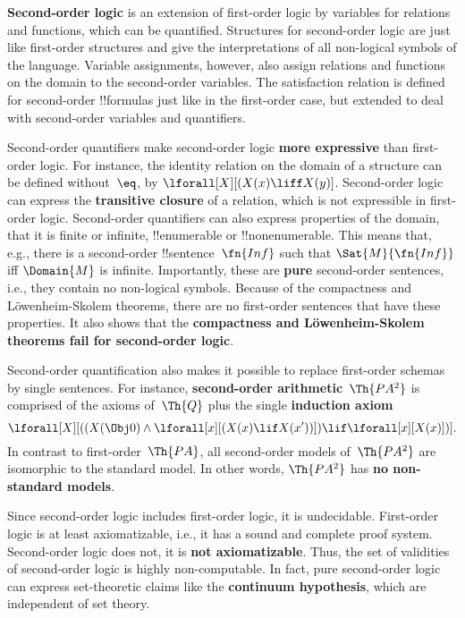 \textbf{Second-order logic} is an extension of first-order logic by
variables for relations and functions, which can be
quantified. Structures for second-order logic are just like
first-order structures and give the interpretations of all non-logical
symbols of the language.  Variable assignments, however, also assign
relations and functions on the domain to the second-order
variables. The satisfaction relation is defined for second-order
!!{formula}s just like in the first-order case, but extended to deal
with second-order variables and quantifiers.

Second-order quantifiers make second-order logic \textbf{more
  expressive} than first-order logic.  For instance, the identity
relation on the domain of a structure can be defined without~$\eq$, by
$\lforall[X][(X(x) \liff X(y)]$. Second-order logic can express the
\textbf{transitive closure} of a relation, which is not expressible in
first-order logic.  Second-order quantifiers can also express
properties of the domain, that it is finite or infinite,
!!{enumerable} or !!{nonenumerable}. This means that, e.g., there is a
second-order !!{sentence}~$\fn{Inf}$ such that $\Sat{M}{\fn{Inf}}$ iff
$\Domain{M}$ is infinite. Importantly, these are \textbf{pure}
second-order sentences, i.e., they contain no non-logical
symbols. Because of the compactness and L\"owenheim-Skolem theorems,
there are no first-order sentences that have these properties.  It
also shows that the \textbf{compactness and L\"owenheim-Skolem
  theorems fail for second-order logic}.

Second-order quantification also makes it possible to replace
first-order schemas by single sentences. For instance,
\textbf{second-order arithmetic}~$\Th{PA^2}$ is comprised of the
axioms of~$\Th{Q}$ plus the single \textbf{induction axiom}
\[
\lforall[X][((X(\Obj 0) \land \lforall[x][(X(x) \lif X(x'))]) \lif
  \lforall[x][X(x)])].
\]
In contrast to first-order~$\Th{PA}$, all second-order models
of~$\Th{PA^2}$ are isomorphic to the standard model. In other words,
$\Th{PA^2}$ has \textbf{no non-standard models}. 

Since second-order logic includes first-order logic, it is
undecidable. First-order logic is at least axiomatizable, i.e., it has
a sound and complete proof system. Second-order logic does not, it is
\textbf{not axiomatizable}. Thus, the set of validities of
second-order logic is highly non-computable. In fact, pure second-order
logic can express set-theoretic claims like the \textbf{continuum
  hypothesis}, which are independent of set theory.

